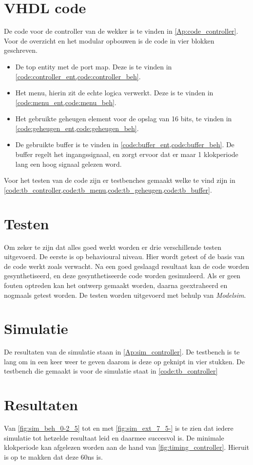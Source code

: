 \section{VHDL code}
De code voor de controller van de wekker is te vinden in \cref{Ap:code_controller}. Voor de overzicht en het modular opbouwen is de code in vier blokken geschreven.
\begin{itemize}[nolistsep]
\item De top entity met de port map. Deze is te vinden in \cref{code:controller_ent,code:controller_beh}.
\item Het menu, hierin zit de echte logica verwerkt. Deze is te vinden in \cref{code:menu_ent,code:menu_beh}.
\item Het gebruikte geheugen element voor de opslag van 16 bits, te vinden in \cref{code:geheugen_ent,code:geheugen_beh}.
\item De gebruikte buffer is te vinden in \cref{code:buffer_ent,code:buffer_beh}. De buffer regelt het ingangssignaal, en zorgt ervoor dat er maar 1 klokperiode lang een hoog signaal gelezen word.
\end{itemize}
Voor het testen van de code zijn er testbenches gemaakt welke te vind zijn in \cref{code:tb_controller,code:tb_menu,code:tb_geheugen,code:tb_buffer}.

\section{Testen}
Om zeker te zijn dat alles goed werkt worden er drie verschillende testen uitgevoerd. De eerste is op behavioural niveau. Hier wordt getest of de basis van de code werkt zoals verwacht. Na een goed geslaagd resultaat kan de code worden gesynthetiseerd, en deze gesynthetiseerde code worden gesimuleerd. Als er geen fouten optreden kan het ontwerp gemaakt worden, daarna geextraheerd en nogmaals getest worden. De testen worden uitgevoerd met behulp van \emph{Modelsim}.


\section{Simulatie}
De resultaten van de simulatie staan in \cref{Ap:sim_controller}. De testbench is te lang om in een keer weer te geven daarom is deze op geknipt in vier stukken. De testbench die gemaakt is voor de simulatie staat in \cref{code:tb_controller}
\section{Resultaten}
Van \cref{fig:sim_beh_0-2_5} tot en met \cref{fig:sim_ext_7_5-} is te zien dat iedere simulatie tot hetzelde resultaat leid en daarmee succesvol is.
De minimale klokperiode kan afgelezen worden aan de hand van \cref{fig:timing_controller}. Hieruit is op te makken dat deze 60ns is.
